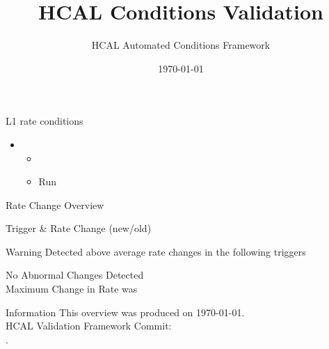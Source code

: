 \documentclass{beamer}
\title{HCAL Conditions Validation}
\author{HCAL Automated Conditions Framework}
\institute{CERN}
\date{\today}
\begin{document}
\frame{\titlepage}





\begin{frame}{L1 rate conditions}
    \begin{itemize}
        \item {}
            \begin{itemize}
                \item {}
                \item Run
            \end{itemize}
    \end{itemize}

\end{frame}


\begin{frame}{Rate Change Overview}

\begin{center}
        Trigger & Rate Change (new/old) \\ \hline
          

    \begin{alertblock}{Warning}
        \large Detected above average rate changes in the following triggers\\
         
    \end{alertblock}
    \centering
    \Large No Abnormal Changes Detected \\
    Maximum Change in Rate was 
\end{center}

\end{frame}



\begin{frame}{Information}
    This overview was produced on \today.\\
    HCAL Validation Framework Commit: \\
    .
\end{frame}
\end{document}
